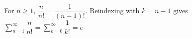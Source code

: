 For $n\ge1$, $\dfrac{n}{n!}=\dfrac{1}{(n-1)!}$. Reindexing with $k=n-1$ gives $\sum_{n=1}^{\infty}\dfrac{n}{n!}=\sum_{k=0}^{\infty}\dfrac{1}{k!}=\boxed e$.
